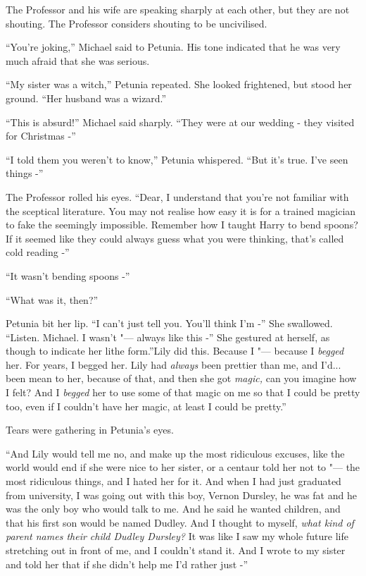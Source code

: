 The Professor and his wife are speaking sharply at each other, but they
are not shouting. The Professor considers shouting to be uncivilised.

``You're joking,'' Michael said to Petunia. His tone indicated that he
was very much afraid that she was serious.

``My sister was a witch,'' Petunia repeated. She looked frightened, but
stood her ground. ``Her husband was a wizard.''

``This is absurd!'' Michael said sharply. ``They were at our wedding -
they visited for Christmas -''

``I told them you weren't to know,'' Petunia whispered. ``But it's true.
I've seen things -''

The Professor rolled his eyes. ``Dear, I understand that you're not
familiar with the sceptical literature. You may not realise how easy it
is for a trained magician to fake the seemingly impossible. Remember how
I taught Harry to bend spoons? If it seemed like they could always guess
what you were thinking, that's called cold reading -''

``It wasn't bending spoons -''

``What was it, then?''

Petunia bit her lip. ``I can't just tell you. You'll think I'm -'' She
swallowed. ``Listen. Michael. I wasn't "--- always like this -'' She
gestured at herself, as though to indicate her lithe form.''Lily did
this. Because I "--- because I \emph{begged} her. For years, I begged her.
Lily had \emph{always} been prettier than me, and I'd... been mean
to her, because of that, and then she got \emph{magic,} can you imagine
how I felt? And I \emph{begged} her to use some of that magic on me so
that I could be pretty too, even if I couldn't have her magic, at least
I could be pretty.''

Tears were gathering in Petunia's eyes.

``And Lily would tell me no, and make up the most ridiculous excuses,
like the world would end if she were nice to her sister, or a centaur
told her not to "--- the most ridiculous things, and I hated her for it.
And when I had just graduated from university, I was going out with this
boy, Vernon Dursley, he was fat and he was the only boy who would talk
to me. And he said he wanted children, and that his first son would be
named Dudley. And I thought to myself, \emph{what kind of parent names
their child Dudley Dursley?} It was like I saw my whole future life
stretching out in front of me, and I couldn't stand it. And I wrote to
my sister and told her that if she didn't help me I'd rather just -''


